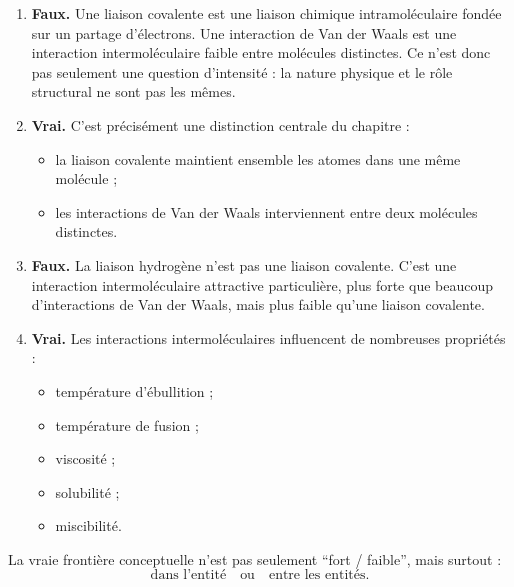 \documentclass[11pt,a4paper]{article}
\begin{document}
\begin{corrigebox}
\begin{enumerate}[label=\alph*)]
    \item \textbf{Faux.}  
    Une liaison covalente est une liaison chimique intramoléculaire fondée sur un partage d'électrons.  
    Une interaction de Van der Waals est une interaction intermoléculaire faible entre molécules distinctes.  
    Ce n'est donc pas seulement une question d'intensité : la nature physique et le rôle structural ne sont pas les mêmes.
    
    \item \textbf{Vrai.}  
    C'est précisément une distinction centrale du chapitre :
    \begin{itemize}
        \item la liaison covalente maintient ensemble les atomes dans une même molécule ;
        \item les interactions de Van der Waals interviennent entre deux molécules distinctes.
    \end{itemize}
    
    \item \textbf{Faux.}  
    La liaison hydrogène n'est pas une liaison covalente.  
    C'est une interaction intermoléculaire attractive particulière, plus forte que beaucoup d'interactions de Van der Waals, mais plus faible qu'une liaison covalente.
    
    \item \textbf{Vrai.}  
    Les interactions intermoléculaires influencent de nombreuses propriétés :
    \begin{itemize}
        \item température d'ébullition ;
        \item température de fusion ;
        \item viscosité ;
        \item solubilité ;
        \item miscibilité.
    \end{itemize}
\end{enumerate}

\begin{ideebox}
La vraie frontière conceptuelle n'est pas seulement ``fort / faible'', mais surtout :
\[
\text{dans l'entité} \quad \text{ou} \quad \text{entre les entités.}
\]
\end{ideebox}
\end{corrigebox}

\end{document}
